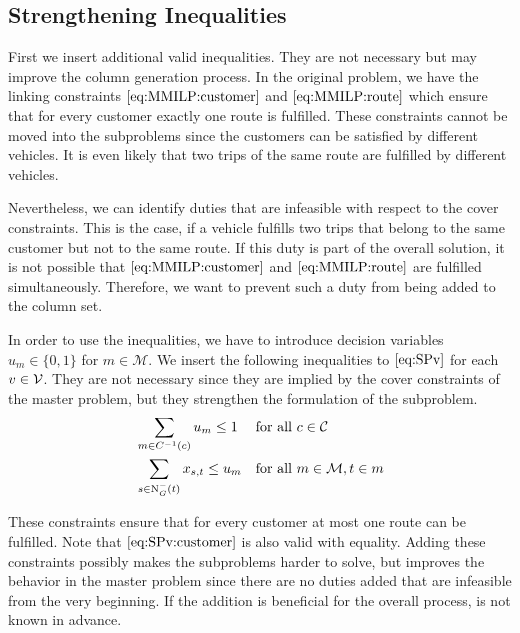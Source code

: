 \subsection{Strengthening Inequalities}

First we insert additional valid inequalities. They are not necessary but may improve the column generation process. In the original problem, we have the linking constraints $\eqref{eq:MMILP:customer}$ and $\eqref{eq:MMILP:route}$ which ensure that for every customer exactly one route is fulfilled. These constraints cannot be moved into the subproblems since the customers can be satisfied by different vehicles. It is even likely that two trips of the same route are fulfilled by different vehicles.

Nevertheless, we can identify duties that are infeasible with respect to the cover constraints. This is the case, if a vehicle fulfills two trips that belong to the same customer but not to the same route. If this duty is part of the overall solution, it is not possible that $\eqref{eq:MMILP:customer}$ and $\eqref{eq:MMILP:route}$ are fulfilled simultaneously. Therefore, we want to prevent such a duty from being added to the column set.

In order to use the inequalities, we have to introduce decision variables $u_m\in\{0,1\}$ for $m\in\mathcal{M}$. We insert the following inequalities to $\eqref{eq:SPv}$ for each $v\in\mathcal{V}$. They are not necessary since they are implied by the cover constraints of the master problem, but they strengthen the formulation of the subproblem.
\begin{align}
	& \sum_{m\in C^{-1}(c)} u_m \leq 1 && \text{for all } c\in\mathcal{C} \label{eq:SPv:customer} \\
	& \sum_{s\in\operatorname{N}_G^-(t)} x_{s,t} \leq u_m && \text{for all } m\in\mathcal{M}, t\in m \label{eq:SPv:route}
\end{align}

These constraints ensure that for every customer at most one route can be fulfilled. Note that $\eqref{eq:SPv:customer}$ is also valid with equality. Adding these constraints possibly makes the subproblems harder to solve, but improves the behavior in the master problem since there are no duties added that are infeasible from the very beginning. If the addition is beneficial for the overall process, is not known in advance.


